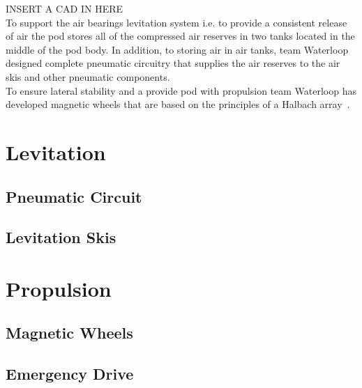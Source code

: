 \documentclass[11pt,a4paper,oldfontcommands]{memoir}
\begin{document}
																																																																											    INSERT A CAD IN HERE\\

																																																																											    To support the air bearings levitation system i.e. to provide a consistent release of air the pod stores all of the compressed air reserves in two tanks located in the middle of the pod body. In addition, to storing air in air tanks, team Waterloop designed complete pneumatic circuitry that supplies the air reserves to the air skis and other pneumatic components.\\

																																																																											    To ensure lateral stability and a provide pod with propulsion team Waterloop has developed magnetic wheels that are based on the principles of a Halbach array~\cite{Halbach_Array}.

																																																																											    \section{Levitation}

																																																																											    \subsection{Pneumatic Circuit}

																																																																											    \subsection{Levitation Skis}

																																																																											    \section{Propulsion}

																																																																											    \subsection{Magnetic Wheels}

																																																																											    \subsection{Emergency Drive}
\end{document}
